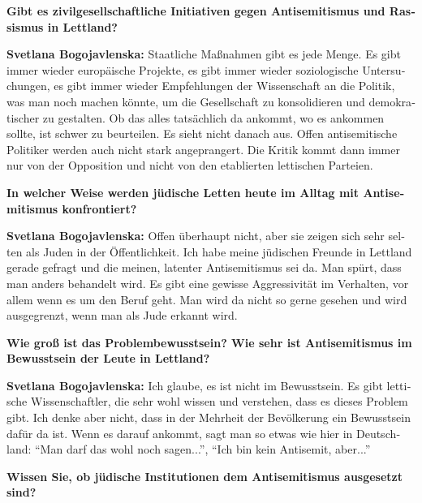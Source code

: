 \begin{otherlanguage}{ngerman}
\textbf{Gibt es zivilgesellschaftliche Initiativen gegen Antisemitismus und Rassismus in Lettland?}

\textbf{Svetlana Bogojavlenska:} Staatliche Maßnahmen gibt es jede Menge. Es gibt immer wieder europäische Projekte, es gibt immer wieder soziologische Untersuchungen, es gibt immer wieder Empfehlungen der Wissenschaft an die Politik, was man noch machen könnte, um die Gesellschaft zu konsolidieren und demokratischer zu gestalten. Ob das alles tatsächlich da ankommt, wo es ankommen sollte, ist schwer zu beurteilen. Es sieht nicht danach aus. Offen antisemitische Politiker werden auch nicht stark angeprangert. Die Kritik kommt dann immer nur von der Opposition und nicht von den etablierten lettischen Parteien.

\textbf{In welcher Weise werden jüdische Letten heute im Alltag mit Antisemitismus konfrontiert?}

\textbf{Svetlana Bogojavlenska:} Offen überhaupt nicht, aber sie zeigen sich sehr selten als Juden in der Öffentlichkeit. Ich habe meine jüdischen Freunde in Lettland gerade gefragt und die meinen, latenter Antisemitismus sei da. Man spürt, dass man anders behandelt wird. Es gibt eine gewisse Aggressivität im Verhalten, vor allem wenn es um den Beruf geht. Man wird da nicht so gerne gesehen und wird ausgegrenzt, wenn man als Jude erkannt wird. 

\textbf{Wie groß ist das Problembewusstsein? Wie sehr ist Antisemitismus im Bewusstsein der Leute in Lettland?}

\textbf{Svetlana Bogojavlenska:} Ich glaube, es ist nicht im Bewusstsein. Es gibt lettische Wissenschaftler, die sehr wohl wissen und verstehen, dass es dieses Problem gibt. Ich denke aber nicht, dass in der Mehrheit der Bevölkerung ein Bewusstsein dafür da ist. Wenn es darauf ankommt, sagt man so etwas wie hier in Deutschland: "`Man darf das wohl noch sagen..."', "`Ich bin kein Antisemit, aber..."' 

\textbf{Wissen Sie, ob jüdische Institutionen dem Antisemitismus ausgesetzt sind?}


\end{otherlanguage}
